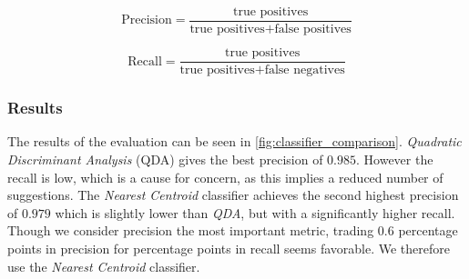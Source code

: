 
\begin{equation}\label{eq:precision}
\text{Precision} = \frac{\text{true positives}}{\text{true positives} + \text{false positives}}
\end{equation}

\begin{equation}\label{eq:recall}
\text{Recall} = \frac{\text{true positives}}{\text{true positives} + \text{false negatives}}
\end{equation}


\subsubsection{Results}
The results of the evaluation can be seen in \cref{fig:classifier_comparison}. \emph{Quadratic Discriminant Analysis} (QDA) gives the best precision of $0.985$. However the recall is low, which is a cause for concern, as this implies a reduced number of suggestions. The \emph{Nearest Centroid} classifier achieves the second highest precision of $0.979$ which is slightly lower than \emph{QDA}, but with a significantly higher recall. Though we consider precision the most important metric, trading $0.6$ percentage points in precision for  percentage points in recall seems favorable. We therefore use the \emph{Nearest Centroid} classifier.


